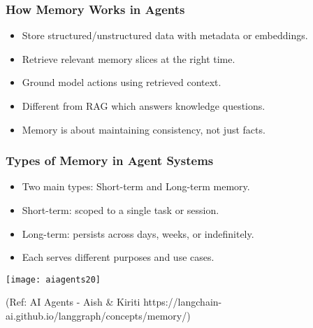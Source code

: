 \begin{frame}[fragile]\frametitle{How Memory Works in Agents}
\begin{itemize}
  \item Store structured/unstructured data with metadata or embeddings.
  \item Retrieve relevant memory slices at the right time.
  \item Ground model actions using retrieved context.
  \item Different from RAG which answers knowledge questions.
  \item Memory is about maintaining consistency, not just facts.
\end{itemize}
\end{frame}

\begin{frame}[fragile]\frametitle{Types of Memory in Agent Systems}

		\begin{itemize}
		  \item Two main types: Short-term and Long-term memory.
		  \item Short-term: scoped to a single task or session.
		  \item Long-term: persists across days, weeks, or indefinitely.
		  \item Each serves different purposes and use cases.
		\end{itemize}

		\begin{center}
		\texttt{[image: aiagents20]}

		{\tiny (Ref: AI Agents - Aish \& Kiriti https://langchain-ai.github.io/langgraph/concepts/memory/)}

		\end{center}



\end{frame}


